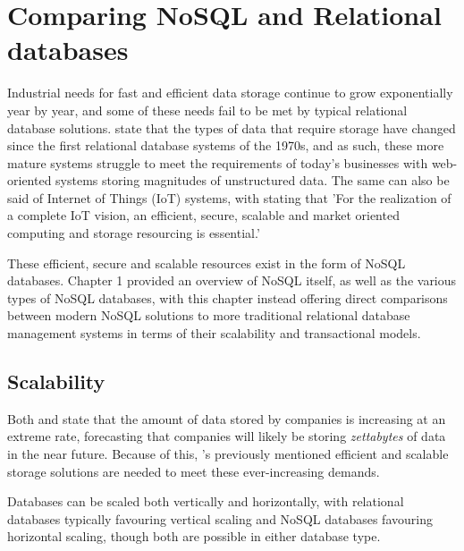 \chapter{Comparing NoSQL and Relational databases} 



Industrial needs for fast and efficient data storage continue to grow exponentially year by year, and some of these needs fail to be met 
by typical relational database solutions. \textcite{corbelliniPersistingBigdataNoSQL2017} state that the types of data that require storage 
have changed since the first relational database systems of the 1970s, and as such, these more mature systems struggle to meet the requirements of
today's businesses with web-oriented systems storing magnitudes of unstructured data. The same can also be said of Internet of Things 
(IoT) systems, with  \textcite{gubbiInternetThingsIoT2013} stating that 'For the realization of a complete IoT vision, an efficient, secure,
scalable and market oriented computing and storage resourcing is essential.'

\para These efficient, secure and scalable resources exist in the form of NoSQL databases. Chapter 1 provided an overview of NoSQL itself, as well 
as the various types of NoSQL databases, with this chapter instead offering direct comparisons between modern NoSQL solutions to more traditional
relational database management systems in terms of their scalability and transactional models. 


\section{Scalability}
Both \textcite{ganiSurveyIndexingTechniques2016} and \textcite{katalBigDataIssues2013} state that the amount of data stored by companies 
is increasing at an extreme rate, forecasting that companies will likely be storing \textit{zettabytes} of data in the near future.
Because of this, \textcite{gubbiInternetThingsIoT2013}'s previously mentioned efficient and scalable storage solutions are needed to meet 
these ever-increasing demands.

\para Databases can be scaled both vertically and horizontally, with relational databases typically favouring vertical scaling and NoSQL 
databases favouring horizontal scaling, though both are possible in either database type. 

